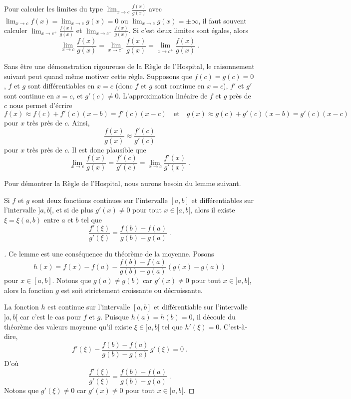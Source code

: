{\begin{rmk}
Pour calculer les limites du type
$\displaystyle \lim_{x\rightarrow c} \frac{f(x)}{g(x)}$ avec
$\displaystyle \lim_{x\rightarrow c} f(x) = \lim_{x\rightarrow c} g(x) = 0$
ou $\displaystyle \lim_{x\rightarrow c} g(x) = \pm \infty$, il faut
souvent calculer
$\displaystyle \lim_{x\rightarrow c^+} \frac{f(x)}{g(x)}$
et $\displaystyle \lim_{x\rightarrow c^-} \frac{f(x)}{g(x)}$.  Si
c'est deux limites sont égales, alors
\[
\lim_{x\rightarrow c} \frac{f(x)}{g(x)} =
\lim_{x\rightarrow c^-} \frac{f(x)}{g(x)} =
\lim_{x\rightarrow c^+} \frac{f(x)}{g(x)} \; .
\]
\end{rmk}

Sans être une démonstration rigoureuse de la Règle de l'Hospital, le
raisonnement suivant peut quand même motiver cette règle.  Supposons
que $f(c)=g(c)=0$, $f$ et $g$ sont différentiables en $x=c$ (donc $f$
et $g$ sont continue en $x=c$), $f'$ et $g'$ sont continue
en $x=c$, et $g'(c)\neq 0$.  L'approximation linéaire de $f$ et $g$
près de $c$ nous permet d'écrire
\[
f(x) \approx f(c) + f'(c)(x-b) = f'(c) (x-c) \quad \text{et} \quad
g(x) \approx g(c) + g'(c)(x-b) = g'(c) (x-c)
\]
pour $x$ très près de $c$.  Ainsi,
\[
\frac{f(x)}{g(x)} \approx \frac{f'(c)}{g'(c)}
\]
pour $x$ très près de $c$.  Il est donc plausible que
\[
\lim_{x\rightarrow c} \frac{f(x)}{g(x)} = \frac{f'(c)}{g'(c)}
= \lim_{x\rightarrow c} \frac{f'(x)}{g'(x)} \; .
\]

Pour démontrer la Règle de l'Hospital, nous aurons besoin du lemme suivant.

\begin{focus}{\lmm}
Si $f$ et $g$ sont deux fonctions continues sur l'intervalle $[a,b]$
et différentiables sur l'intervalle $]a,b[$, et si de plus
$g'(x)\neq 0$ pour tout $x\in]a,b[$, alors il existe $\xi = \xi(a,b)$
entre $a$ et $b$ tel que
\[
\frac{f'(\xi)}{g'(\xi)} = \frac{f(b)-f(a)}{g(b)-g(a)} \; .
\]
\end{focus}

\begin{proof}[\theory]
Ce lemme est une conséquence du théorème de la moyenne.  Posons
\[
h(x) = f(x) - f(a) - \frac{f(b)-f(a)}{g(b)-g(a)}
\left(g(x)-g(a)\right)
\]
pour $x\in[a,b]$.  Notons que $g(a)\neq g(b)$ car $g'(x)\neq 0$ pour
tout $x\in]a,b[$, alors la fonction $g$ est soit strictement
croissante ou décroissante.

La fonction $h$ est continue sur l'intervalle $[a,b]$ et
différentiable sur l'intervalle $]a,b[$ car c'est le cas pour $f$ et
$g$.  Puisque $h(a) = h(b) = 0$, il découle du théorème des valeurs
moyenne qu'il existe $\xi\in ]a,b[$ tel que $h'(\xi)=0$.
C'est-à-dire,
\[
f'(\xi) - \frac{f(b)-f(a)}{g(b)-g(a)} \, g'(\xi) = 0 \; .
\]
D'où
\[
\frac{f'(\xi)}{g'(\xi)} = \frac{f(b)-f(a)}{g(b)-g(a)} \; .
\]
Notons que $g'(\xi) \neq 0$ car $g'(x)\neq 0$ pour tout $x\in]a,b[$.
\end{proof}

}
